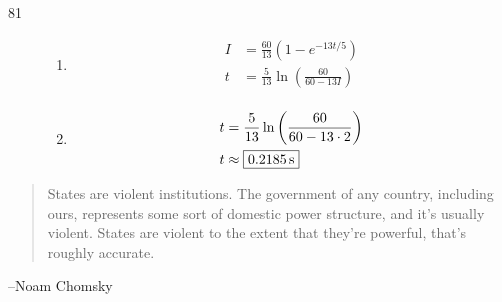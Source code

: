 \documentclass{exam}
\begin{document}
\begin{description}
      \item[81]
        \begin{enumerate}[a]
          \item 
            \begin{align*}
              I &= \frac{60}{13} \left( 1 - e^{-13t/5} \right) \\
              t &= \boxed{\frac{5}{13} \ln \left( \frac{60}{60 - 13I} \right) } \\
            \end{align*}

          \item 
            \begin{align*}
              t &= \frac{5}{13} \ln \left( \frac{60}{60 - 13 \cdot 2} \right)  \\
              t &\approx \boxed{\unit[0.2185]{s}} \\
            \end{align*}

        \end{enumerate}

    \end{description}

  \else
    \vspace{6 cm}
    \begin{quote}
      \begin{em}
        States are violent institutions. The government of any country, including ours, represents some sort of domestic
        power structure, and it's usually violent. States are violent to the extent that they're powerful, that's
        roughly accurate.


      \end{em}
    \end{quote}
    \hspace{1 cm} --Noam Chomsky 
  \fi
\end{document}
